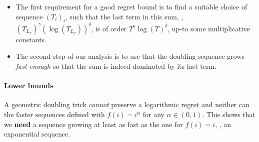 \documentclass[12pt]{colt2018} %
\begin{document}
\begin{itemize}
    \item
    The first requirement for a good regret bound is to find a suitable choice of sequence $(T_i)_i$,
    such that the last term in this sum, \ie, $(T_{L_T})^{\gamma} (\log(T_{L_T}))^{\delta}$, is of order $T^{\gamma} \log(T)^{\delta}$, up-to some multiplicative constants.

    \item
    The second step of our analysis is to use that the doubling sequence grows \emph{fast enough} so that the sum is indeed dominated by its last term.
\end{itemize}


\paragraph{Lower bounds}

A geometric doubling trick \emph{cannot} preserve a logarithmic regret and neither can the faster sequences defined with $f(i) = i^\alpha$ for any $\alpha \in (0,1)$.
This shows that we \textbf{need} a sequence growing at least as fast as the one for $f(i) = i$, \ie, an exponential sequence.

\end{document}
